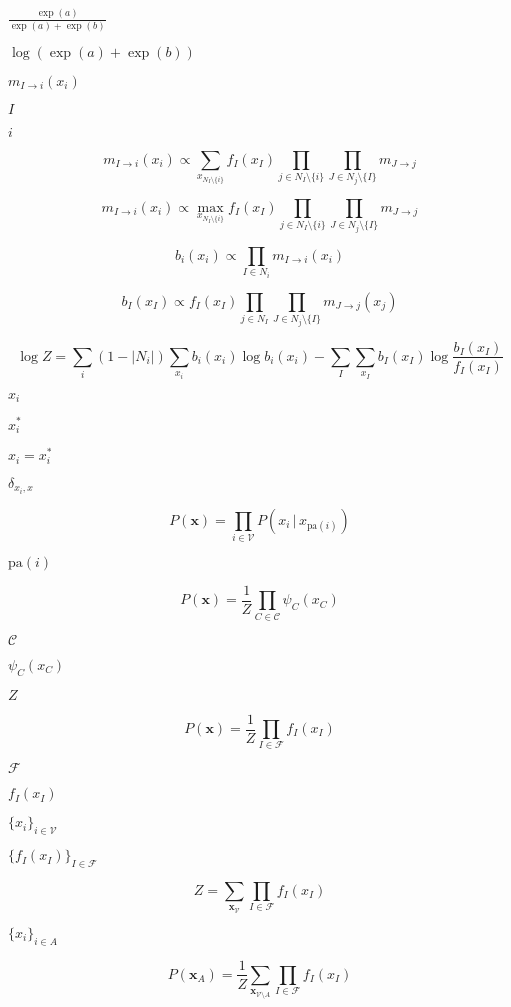\documentclass{article}
\begin{document}
$\frac{\exp(a)}{\exp(a)+\exp(b)}$
\pagebreak

$\log\left(\exp(a) + \exp(b)\right)$
\pagebreak

$m_{I\to i}(x_i)$
\pagebreak

$I$
\pagebreak

$i$
\pagebreak

\[ m_{I\to i}(x_i) \propto \sum_{x_{N_I\setminus\{i\}}} f_I(x_I) \prod_{j\in N_I\setminus\{i\}} \prod_{J\in N_j\setminus\{I\}} m_{J\to j}\]
\pagebreak

\[ m_{I\to i}(x_i) \propto \max_{x_{N_I\setminus\{i\}}} f_I(x_I) \prod_{j\in N_I\setminus\{i\}} \prod_{J\in N_j\setminus\{I\}} m_{J\to j}\]
\pagebreak

\[ b_i(x_i) \propto \prod_{I\in N_i} m_{I\to i}(x_i)\]
\pagebreak

\[ b_I(x_I) \propto f_I(x_I) \prod_{j\in N_I} \prod_{J\in N_j\setminus\{I\}} m_{J\to j}(x_j) \]
\pagebreak

\[ \log Z = \sum_i (1 - |N_i|) \sum_{x_i} b_i(x_i) \log b_i(x_i) - \sum_I \sum_{x_I} b_I(x_I) \log \frac{b_I(x_I)}{f_I(x_I)} \]
\pagebreak

$ x_i $
\pagebreak

$ x_i^* $
\pagebreak

$ x_i = x_i^* $
\pagebreak

$\delta_{x_i, x}$
\pagebreak

\[ P(\mathbf{x}) = \prod_{i\in\mathcal{V}} P(x_i \,|\, x_{\mathrm{pa}(i)}) \]
\pagebreak

$\mathrm{pa}(i)$
\pagebreak

\[ P(\mathbf{x}) = \frac{1}{Z} \prod_{C\in\mathcal{C}} \psi_C(x_C) \]
\pagebreak

$ \mathcal{C} $
\pagebreak

$ \psi_C(x_C) $
\pagebreak

$ Z $
\pagebreak

\[ P(\mathbf{x}) = \frac{1}{Z} \prod_{I\in \mathcal{F}} f_I(x_I) \]
\pagebreak

$ \mathcal{F} $
\pagebreak

$ f_I(x_I) $
\pagebreak

$\{x_i\}_{i\in\mathcal{V}}$
\pagebreak

$\{f_I(x_I)\}_{I\in\mathcal{F}}$
\pagebreak

\[ Z = \sum_{\mathbf{x}_{\mathcal{V}}} \prod_{I \in \mathcal{F}} f_I(x_I) \]
\pagebreak

$\{x_i\}_{i\in A}$
\pagebreak

\[ P(\mathbf{x}_{A}) = \frac{1}{Z} \sum_{\mathbf{x}_{\mathcal{V}\setminus A}} \prod_{I \in \mathcal{F}} f_I(x_I) \]
\pagebreak
\end{document}
